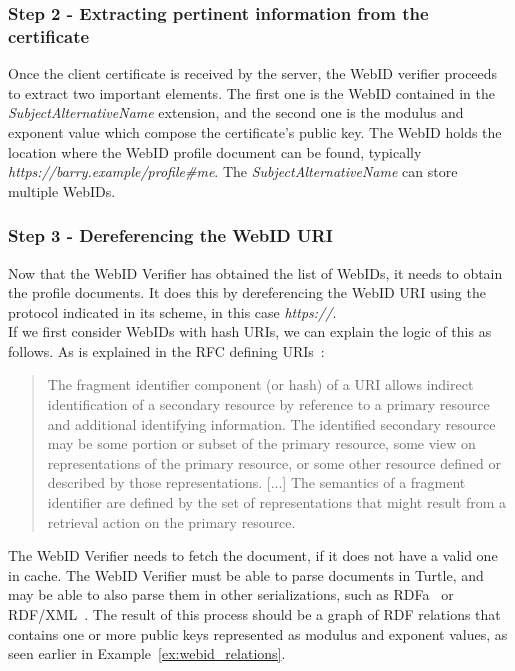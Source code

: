 \subsubsection{Step 2 - Extracting pertinent information from the certificate}
\label{subsubsec:webid_verif}

Once the client certificate is received by the server, the WebID verifier proceeds to extract two important elements. The first one is the WebID contained in the \textit{SubjectAlternativeName} extension, and the second one is the modulus and exponent value which compose the certificate's public key. The WebID holds the location where the WebID profile document can be found, typically \textit{https://barry.example/profile\#me}. The \textit{SubjectAlternativeName} can store multiple WebIDs.

\subsubsection{Step 3 - Dereferencing the WebID URI}
Now that the WebID Verifier has obtained the list of WebIDs, it needs to obtain the profile documents. It does this by dereferencing the WebID URI using the protocol indicated in its scheme, in this case \textit{https://}.\\

If we first consider WebIDs with hash URIs, we can explain the logic of this as follows. As is explained in the RFC defining URIs~\cite{berners1998uniform}:

\begin{quote}
The fragment identifier component (or hash) of a URI allows indirect identification of a secondary resource by reference to a primary resource and additional identifying information. The identified secondary resource may be some portion or subset of the primary resource, some view on representations of the primary resource, or some other resource defined or described by those representations. [...] The semantics of a fragment identifier are defined by the set of representations that might result from a retrieval action on the primary resource.
\end{quote}

The WebID Verifier needs to fetch the document, if it does not have a valid one in cache. The WebID Verifier must be able to parse documents in Turtle, and may be able to also parse them in other serializations, such as RDFa~\cite{adida2012rdfa} or RDF/XML~\cite{beckett2004rdf}. The result of this process should be a graph of RDF relations that contains one or more public keys represented as modulus and exponent values, as seen earlier in Example~\ref{ex:webid_relations}.\\

